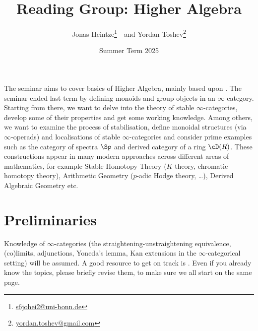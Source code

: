 \documentclass{article}
\title{\vspace{-60pt}Reading Group: Higher Algebra}
\author{Jonas Heintze\thanks{\href{mailto:s6johei2@uni-bonn.de}{
      \url{s6johei2@uni-bonn.de}}}~~and 
  Yordan Toshev\thanks{\href{mailto:yordan.toshev@uni-bonn.de}{
\url{yordan.toshev@gmail.com}}}}
\date{Summer Term 2025}
\begin{document}
\maketitle



\vspace{-5pt}
The seminar aims to cover basics of Higher Algebra, mainly based
upon \cite[Chapter II]{K-ThrNotes}.
The seminar ended last term by defining monoids and 
group objects in an $\infty$-category.
Starting from there, we want to delve into the
theory of stable $\infty$-categories, develop some
of their properties and get some working knowledge.
Among others, we want to examine the process of
stabilisation, define monoidal structures (via $\infty$-operads) 
and localisations 
of stable $\infty$-categories and consider prime examples such as
the category of spectra $\Sp$ and derived category of a 
ring $\cD(R)$.
These constructions appear in many modern approaches across different areas of 
mathematics,
for example
Stable Homotopy Theory ($K$-theory, chromatic homotopy theory),
Arithmetic Geometry ($p$-adic Hodge theory, \dots),
Derived Algebraic Geometry etc.


\section*{Preliminaries}
Knowledge of $\infty$-categories
(the straightening-unstraightening equivalence, (co)limits,
adjunctions, Yoneda's lemma, Kan extensions in the $\infty$-categorical
setting) will be assumed.
A good resource to get on track is \cite[Chapters 1-6]{infty-CatNotes}.
Even if you already know the topics, please briefly revise them,
to make sure we all start on the same page.
\end{document}
